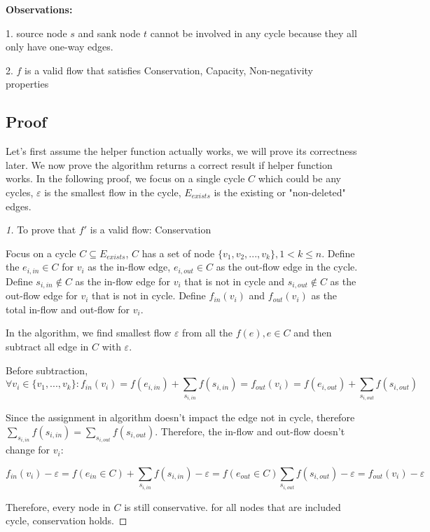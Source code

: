 \documentclass[openany]{article}
\begin{document}
\textbf{Observations:}

1. source node $s$ and sank node $t$ cannot be involved in any cycle because they all only have one-way edges.

2. $f$ is a valid flow that satisfies Conservation, Capacity, Non-negativity properties

\subsection*{Proof}
Let's first assume the helper function actually works, we will prove its correctness later. We now prove the algorithm returns a correct result if helper function works. In the following proof, we focus on a single cycle $C$ which could be any cycles, $\varepsilon$ is the smallest flow in the cycle, $E_{exists}$ is the existing or "non-deleted" edges.

\begin{proof}[1]{To prove that $f'$ is a valid flow:} Conservation

Focus on a cycle $C \subseteq E_{exists}$, $C$ has a set of node $\{v_1, v_2, ..., v_k\}, 1 < k \leq n$. Define the $e_{i,in} \in C$ for $v_i$ as the in-flow edge, $e_{i,out} \in C$ as the out-flow edge in the cycle. Define $s_{i,in} \notin C$ as the in-flow edge for $v_i$ that is not in cycle and $s_{i,out} \notin C$ as the out-flow edge for $v_i$ that is not in cycle. Define $f_{in}(v_i)$ and $f_{out}(v_i)$ as the total in-flow and out-flow for $v_i$.

In the algorithm, we find smallest flow $\varepsilon$ from all the $f(e), e\in C$ and then subtract all edge in $C$ with $\varepsilon$.

Before subtraction, \[\forall v_i \in \{v_1, ..., v_k\}: f_{in}(v_i) = f(e_{i,in}) + \sum_{s_{i,in}} f(s_{i,in}) = f_{out}(v_i) = f(e_{i,out})+\sum_{s_{i,out}} f(s_{i,out}) \]

Since the assignment in algorithm doesn't impact the edge not in cycle, therefore $\sum_{s_{i,in}} f(s_{i,in}) = \sum_{s_{i,out}} f(s_{i,out})$. Therefore, the in-flow and out-flow doesn't change for $v_i$:

\[f_{in}(v_i) - \varepsilon = f(e_{in} \in C) + \sum_{s_{i,in}} f(s_{i,in}) - \varepsilon = f(e_{out} \in C) \sum_{s_{i,out}} f(s_{i,out}) - \varepsilon = f_{out}(v_i) - \varepsilon\]

Therefore, every node in $C$ is still conservative. for all nodes that are included cycle, conservation holds.


\end{proof}
\end{document}
